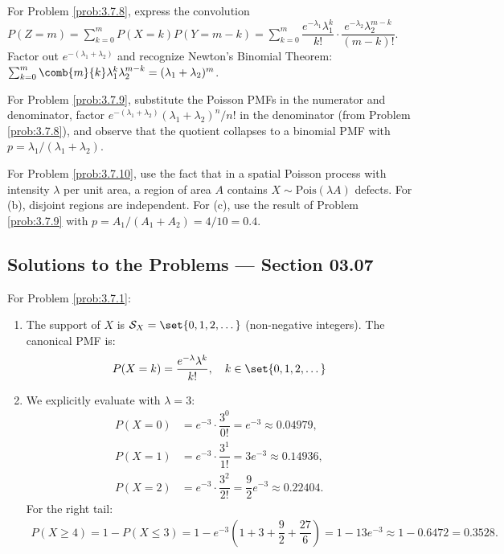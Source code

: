 \begin{sugerencia}
	\label{sug:3.7.8}
	For Problem \ref{prob:3.7.8}, express the convolution $P(Z = m) = \sum_{k=0}^{m} P(X=k) P(Y=m-k) = \sum_{k=0}^{m} \dfrac{e^{-\lambda_{1}} \lambda_{1}^{k}}{k!} \cdot \dfrac{e^{-\lambda_{2}} \lambda_{2}^{m-k}}{(m-k)!}$. Factor out $e^{-(\lambda_{1}+\lambda_{2})}$ and recognize Newton's Binomial Theorem: $\sum_{k=0}^{m} \comb{m}{k} \lambda_{1}^{k} \lambda_{2}^{m-k} = (\lambda_{1} + \lambda_{2})^{m}$.
\end{sugerencia}

\begin{sugerencia}
	\label{sug:3.7.9}
	For Problem \ref{prob:3.7.9}, substitute the Poisson PMFs in the numerator and denominator, factor $e^{-(\lambda_{1}+\lambda_{2})}(\lambda_{1}+\lambda_{2})^{n}/n!$ in the denominator (from Problem \ref{prob:3.7.8}), and observe that the quotient collapses to a binomial PMF with $p = \lambda_{1}/(\lambda_{1}+\lambda_{2})$.
\end{sugerencia}

\begin{sugerencia}
	\label{sug:3.7.10}
	For Problem \ref{prob:3.7.10}, use the fact that in a spatial Poisson process with intensity $\lambda$ per unit area, a region of area $A$ contains $X \sim \text{Pois}(\lambda A)$ defects. For (b), disjoint regions are independent. For (c), use the result of Problem \ref{prob:3.7.9} with $p = A_{1}/(A_{1}+A_{2}) = 4/10 = 0.4$.
\end{sugerencia}

\subsection*{Solutions to the Problems --- Section 03.07}

\begin{solucion}
	\label{sol:3.7.1}
	For Problem \ref{prob:3.7.1}:
	\begin{enumerate}
		\item The support of $X$ is $\mathcal{S}_{X} = \set{0, 1, 2, \dots}$ (non-negative integers). The canonical PMF is:
		\begin{align*}
			P(X = k) = \dfrac{e^{-\lambda} \lambda^{k}}{k!}, \quad k \in \set{0, 1, 2, \dots}
		\end{align*}
		\item We explicitly evaluate with $\lambda = 3$:
		\begin{align*}
			P(X = 0) &= e^{-3} \cdot \dfrac{3^{0}}{0!} = e^{-3} \approx 0.04979, \\
			P(X = 1) &= e^{-3} \cdot \dfrac{3^{1}}{1!} = 3 e^{-3} \approx 0.14936, \\
			P(X = 2) &= e^{-3} \cdot \dfrac{3^{2}}{2!} = \dfrac{9}{2} e^{-3} \approx 0.22404.
		\end{align*}
		For the right tail:
		\begin{align*}
			P(X \ge 4) = 1 - P(X \le 3) = 1 - e^{-3}\left(1 + 3 + \dfrac{9}{2} + \dfrac{27}{6}\right) = 1 - 13 e^{-3} \approx 1 - 0.6472 = 0.3528.
		\end{align*}
	\end{enumerate}
\end{solucion}

